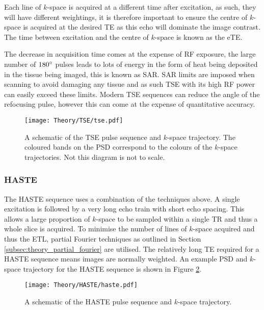 Each line of $k$-space is acquired at a different time after excitation, as such, they will have different \ttwo weightings, it is therefore important to ensure the centre of $k$-space is acquired at the desired \ac{TE} as this echo will dominate the image contrast. The time between excitation and the centre of $k$-space is known as the \ac{eTE}.

The decrease in acquisition time comes at the expense of \ac{RF} exposure, the large number of $180\degree{ }$ pulses leads to lots of energy in the form of heat being deposited in the tissue being imaged, this is known as \ac{SAR}. \ac{SAR} limits are imposed when scanning to avoid damaging any tissue and as such \ac{TSE} with its high \ac{RF} power can easily exceed these limits. Modern \ac{TSE} sequences can reduce the angle of the refocusing pulse, however this can come at the expense of quantitative accuracy.

\begin{figure}[H]
	\centering
	\texttt{[image: Theory/TSE/tse.pdf]}
	\caption{A schematic of the \ac{TSE} pulse sequence and $k$-space trajectory. The coloured bands on the \ac{PSD} correspond to the colours of the $k$-space trajectories. Not this diagram is not to scale.}
	\label{fig:theory_tse}	
\end{figure}

\subsubsection{\ac*{HASTE}}
The \ac{HASTE} sequence uses a combination of the techniques above. A single excitation is followed by a very long echo train with short echo spacing. This allows a large proportion of $k$-space to be sampled within a single \ac{TR} and thus a whole slice is acquired. To minimise the number of lines of $k$-space acquired and thus the \ac{ETL}, partial Fourier techniques as outlined in Section \ref{subsec:theory_partial_fourier} are utilised. The relatively long \ac{TE} required for a \ac{HASTE} sequence means images are normally \ttwo weighted. An example \ac{PSD} and $k$-space trajectory for the \ac{HASTE} sequence is shown in Figure \ref{fig:theory_haste_psd}.

\begin{figure}[H]
	\centering
	\texttt{[image: Theory/HASTE/haste.pdf]}
	\caption{A schematic of the \ac{HASTE} pulse sequence and $k$-space trajectory.}
	\label{fig:theory_haste_psd}	
\end{figure}

